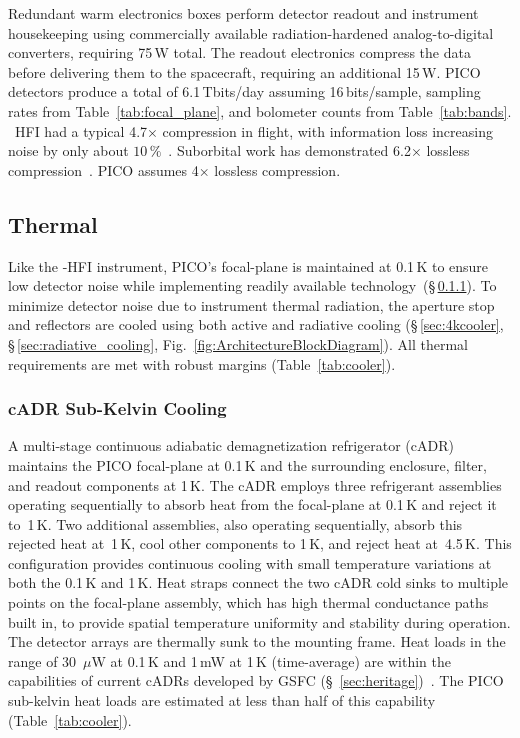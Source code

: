 Redundant warm electronics boxes perform detector readout and instrument housekeeping using commercially available radiation-hardened analog-to-digital converters, requiring 75\,W total. The readout electronics compress the data before delivering them to the spacecraft, requiring an additional 15\,W. PICO detectors produce a total of 6.1\,Tbits/day assuming 16\,bits/sample, sampling rates from Table~\ref{tab:focal_plane}, and bolometer counts from Table~\ref{tab:bands}. \planck \ HFI had a typical 4.7$\times$ compression in flight, with information loss increasing noise by only about $10\,\%$~\citep{Pajot2018,PlanckHFI2011}. Suborbital work has demonstrated 6.2$\times$ lossless compression~\citep{EBEX2017}. PICO assumes 4$\times$ lossless compression.

\subsection{Thermal}
\label{sec:thermal} %

Like the \planck -HFI instrument, PICO's focal-plane is maintained at 0.1\,K to ensure low detector noise while implementing readily available technology~(\S\,\ref{sec:cadr}). To minimize detector noise due to instrument thermal radiation, the aperture stop and reflectors are cooled using both active and radiative cooling (\S\,\ref{sec:4kcooler}, \S\,\ref{sec:radiative_cooling}, Fig.~\ref{fig:ArchitectureBlockDiagram}).  All thermal requirements are met with robust margins (Table~\ref{tab:cooler}).



\subsubsection{cADR Sub-Kelvin Cooling}
\label{sec:cadr} %

A multi-stage continuous adiabatic demagnetization refrigerator (cADR) maintains the PICO focal-plane at 0.1\,K and the surrounding enclosure, filter, and readout components at 1\,K. The cADR employs three refrigerant assemblies operating sequentially to absorb heat from the focal-plane at 0.1\,K and reject it to~1\,K. Two additional assemblies, also operating sequentially, absorb this rejected heat at~1\,K, cool other components to 1\,K, and reject heat at~4.5\,K. This configuration provides continuous cooling with small temperature variations at both the 0.1\,K and 1\,K. Heat straps connect the two cADR cold sinks to multiple points on the focal-plane assembly,
which has high thermal conductance paths built in, to provide spatial temperature uniformity and stability during operation. The detector arrays are thermally sunk to the mounting frame.  Heat loads in the range of 30~$\mu$W at 0.1\,K and 1\,mW at 1\,K (time-average) are within the capabilities of current cADRs developed by GSFC (\S~\ref{sec:heritage})~\citep{Shirron2012,Shirron2016}. The PICO sub-kelvin heat loads are estimated at less than half of this capability (Table~\ref{tab:cooler}).

